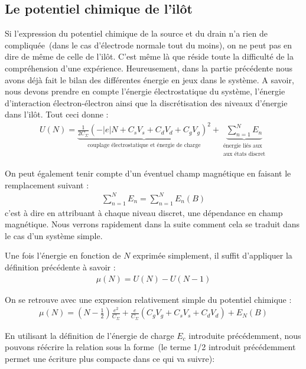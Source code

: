 \subsection{Le potentiel chimique de l'il\^ot}
Si l'expression du potentiel chimique de la source et du drain n'a rien de compliquée~(dans le cas d'électrode normale tout du moins), on ne peut pas en dire de m\^eme de celle de l'il\^ot. C'est m\^eme là que réside toute la difficulté de la compréhension d'une expérience. Heureusement, dans la partie précédente nous avons déjà fait le bilan des différentes énergie en jeux dans le système. A savoir, nous devons prendre en compte l'énergie électrostatique du système, l'énergie d'interaction électron-électron ainsi que la discrétisation des niveaux d'énergie dans l'il\^ot. Tout ceci donne :
\begin{eqnarray}
U(N) = \underbrace{\frac{1}{2C_{\Sigma}} (-|e|N + C_sV_s + C_dV_d + C_gV_g)^2}_{\text{couplage électrostatique et énergie de charge}}
+ 
\underbrace{\sum_{n=1}^{N} E_n}_{\substack{\text{énergie liés aux} \\\text{aux états discret}}}
\end{eqnarray}

On peut également tenir compte d'un éventuel champ magnétique en faisant le remplacement suivant :
\begin{eqnarray}
\sum_{n=1}^N E_n = \sum_{n=1}^N E_n(B) \nonumber
\end{eqnarray}
c'est à dire en attribuant à chaque niveau discret, une dépendance en champ magnétique. Nous verrons rapidement dans la suite comment cela se traduit dans le cas d'un système simple. 

Une fois l'énergie en fonction de $N$ exprimée simplement, il suffit d'appliquer la définition précédente à savoir :
\begin{eqnarray}
\mu(N) = U(N) - U(N-1) \nonumber
\end{eqnarray}

On se retrouve avec une expression relativement simple du potentiel chimique :
\begin{eqnarray}
\mu(N) = (N-\frac{1}{2})\frac{e^2}{C_{\Sigma}}
+ 
\frac{e}{C_{\Sigma}}(C_gV_g + C_sV_s + C_dV_d)
+
E_N(B)
\end{eqnarray}

En utilisant la définition de l'énergie de charge $E_c$ introduite précédemment, nous pouvons réécrire la relation sous la forme~(le terme 1/2 introduit précédemment permet une écriture plus compacte dans ce qui va suivre):

